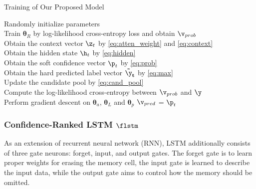 \documentclass[letterpaper]{article} %
\begin{document}
{\color{blue}
\begin{algorithm}[t]
	\label{alg:training}
	\DontPrintSemicolon
	\caption{Training of Our Proposed Model}

    \BlankLine
	Randomly initialize parameters\\
    Train $\mathbf{\theta}_R$ by log-likelihood cross-entropy loss and obtain $\mathbf{\v}_{prob}$\\
	{
        {
        	Obtain the context vector $\mathbf{\z}_t$ by \eqref{eq:atten_weight} and \eqref{eq:context}\\
            Obtain the hidden state $\mathbf{\h}_t$ by \eqref{eq:hidden}\\
            Obtain the soft confidence vector $\mathbf{\p}_t$ by \eqref{eq:prob}\\
            Obtain the hard predicted label vector $\mathbf{\tilde{\y}_t}$ by \eqref{eq:max}\\
            Update the candidate pool by \eqref{eq:cand_pool}\\
            Compute the log-likelihood cross-entropy between $\mathbf{\v}_{prob}$ and $\mathbf{\y}$\\
            Perform gradient descent on $\mathbf{\theta}_a$, $\mathbf{\theta}_L$ and $\mathbf{\theta}_p$
            $\mathbf{\v}_{pred}$ = $\mathbf{\p}_t$
        }
    }
\end{algorithm}
}

\subsubsection{Confidence-Ranked LSTM $\flstm$}
\label{LSTM}
As an extension of recurrent neural network (RNN), LSTM additionally consists of three gate neurons: forget, input, and output gates. The forget gate is to learn proper weights for erasing the memory cell, the input gate is learned to describe the input data, while the output gate aims to control how the memory should be omitted.
\end{document}
